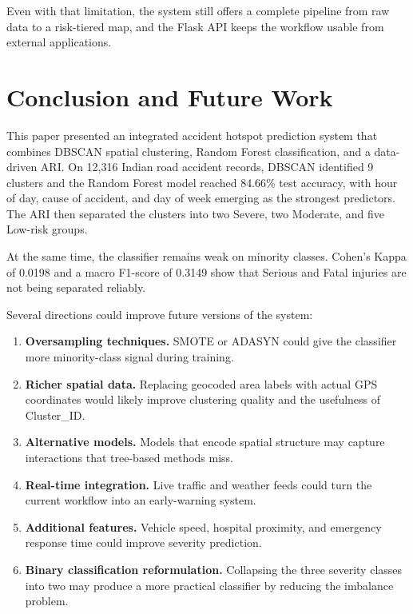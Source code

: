 \documentclass[conference]{IEEEtran}
\begin{document}
Even with that limitation, the system still offers a complete pipeline from raw data to a risk-tiered map, and the Flask API keeps the workflow usable from external applications.

\section{Conclusion and Future Work}

This paper presented an integrated accident hotspot prediction system that combines DBSCAN spatial clustering, Random Forest classification, and a data-driven ARI. On 12,316 Indian road accident records, DBSCAN identified 9 clusters and the Random Forest model reached 84.66\% test accuracy, with hour of day, cause of accident, and day of week emerging as the strongest predictors. The ARI then separated the clusters into two Severe, two Moderate, and five Low-risk groups.

At the same time, the classifier remains weak on minority classes. Cohen's Kappa of 0.0198 and a macro F1-score of 0.3149 show that Serious and Fatal injuries are not being separated reliably.

Several directions could improve future versions of the system:

\begin{enumerate}
\item \textbf{Oversampling techniques.} SMOTE or ADASYN could give the classifier more minority-class signal during training.

\item \textbf{Richer spatial data.} Replacing geocoded area labels with actual GPS coordinates would likely improve clustering quality and the usefulness of Cluster\_ID.

\item \textbf{Alternative models.} Models that encode spatial structure may capture interactions that tree-based methods miss.

\item \textbf{Real-time integration.} Live traffic and weather feeds could turn the current workflow into an early-warning system.

\item \textbf{Additional features.} Vehicle speed, hospital proximity, and emergency response time could improve severity prediction.

\item \textbf{Binary classification reformulation.} Collapsing the three severity classes into two may produce a more practical classifier by reducing the imbalance problem.
\end{enumerate}
\end{document}
